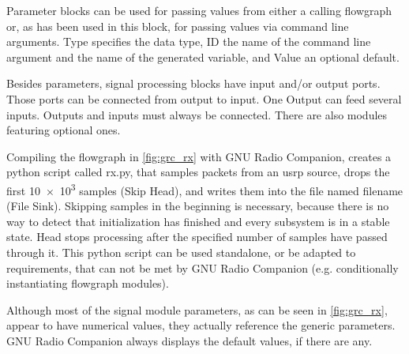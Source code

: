 \documentclass[12pt,a4paper,parskip=full,abstracton]{scrartcl}
\begin{document}
{\ttfamily Parameter} blocks can be used for passing values from either a calling flowgraph or, as has
been used in this block, for passing values via command line arguments. {\ttfamily Type} specifies the
data type, {\ttfamily ID} the name of the command line argument and the name of the generated variable,
and {\ttfamily Value} an optional default.

Besides parameters, signal processing blocks have input and/or output ports. Those ports
can be connected from output to input. One Output can feed several inputs. Outputs and inputs
must always be connected. There are also modules featuring optional ones.

Compiling the flowgraph in \cref{fig:grc_rx} with GNU Radio Companion, creates a python script
called {\ttfamily rx.py}, that samples packets from an \gls{usrp} source, drops the first
\num{10e3} samples ({\ttfamily Skip Head}), and writes
them into the file named {\ttfamily filename} ({\ttfamily File Sink}). Skipping samples in the
beginning is necessary, because there is no way to detect that initialization has finished
and every subsystem is in a stable state. {\ttfamily Head}
stops processing after the specified number of samples have passed through it. This python
script can be used standalone, or be adapted to requirements, that can not be met by GNU Radio
Companion (e.g. conditionally instantiating flowgraph modules).

Although most of the signal module parameters, as can be seen in \cref{fig:grc_rx}, appear to have
numerical values, they actually reference the generic parameters. GNU Radio Companion always displays the
default values, if there are any.
\end{document}
